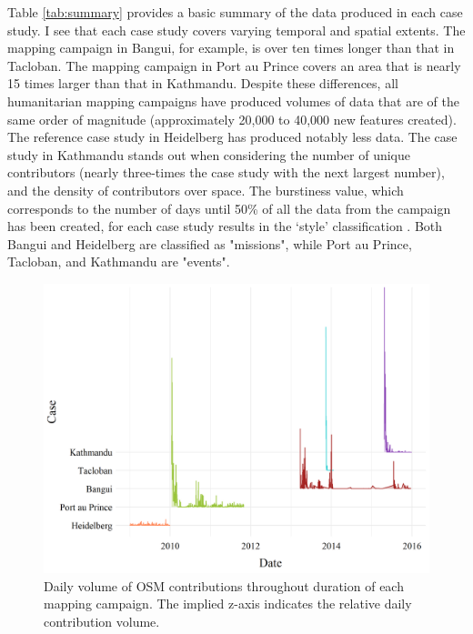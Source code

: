 Table \ref{tab:summary} provides a basic summary of the data produced in each case study. I see that each case study covers varying temporal and spatial extents. The mapping campaign in Bangui, for example, is over ten times longer than that in Tacloban. The mapping campaign in Port au Prince covers an area that is nearly 15 times larger than that in Kathmandu. Despite these differences, all humanitarian mapping campaigns have produced volumes of data that are of the same order of magnitude (approximately 20,000 to 40,000 new features created). The reference case study in Heidelberg has produced notably less data. The case study in Kathmandu stands out when considering the number of unique contributors (nearly three-times the case study with the next largest number), and the density of contributors over space. The burstiness value, which corresponds to the number of days until 50\% of all the data from the campaign has been created, for each case study results in the ‘style’ classification \parencite{dittus_mass_2017}. Both Bangui and Heidelberg are classified as "missions", while Port au Prince, Tacloban, and Kathmandu are "events". 

\begin{figure} %
    \centering %
    \includegraphics[width = \textwidth]{Images/overtime.png} %
    \caption[Daily volume of OSM contributions throughout duration of each mapping campaign.]{Daily volume of OSM contributions throughout duration of each mapping campaign. The implied z-axis indicates the relative daily contribution volume.} %
    \label{fig:time} %
\end{figure}

